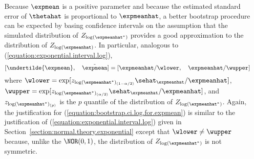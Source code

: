Because $\expmean$ is a positive parameter and because the estimated
standard error of $\thetahat$ is proportional to $\expmeanhat$, a
better bootstrap procedure can be expected by basing confidence
intervals on the assumption that the simulated distribution of
$Z_{\log(\expmeanhat^{*})}$ provides a good approximation to the
distribution of $Z_{\log(\expmeanhat)}$. In particular, analogous to
(\ref{equation:exponential.interval.log}),
\begin{equation}
\label{equation:bootstrap.ci.log.for.expmean}
[ \undertilde{\expmean}, \quad \tilde{\expmean}]=
[\expmeanhat/\wlower, \quad \expmeanhat/\wupper]
\end{equation}
where $\wlower=\exp[ z_{\log(\expmeanhat^{*})_{(1-\alpha/2)}} 
\sehat_{\expmeanhat}/\expmeanhat]$, $\wupper=
\exp[z_{\log(\expmeanhat^{*})_{(\alpha/2)}} \sehat_{\expmeanhat}/
\expmeanhat]$, and
$z_{\log(\expmeanhat^{*})_{(p)}}$ is the $p$ quantile of the
distribution of $Z_{\log(\expmeanhat^{*})}$.  Again, the
justification for (\ref{equation:bootstrap.ci.log.for.expmean}) is
similar to the justification of
(\ref{equation:exponential.interval.log}) given in
Section~\ref{section:normal.theory.exponential} except that $\wlower
\ne \wupper$ because, unlike the $\NOR(0,1)$, the distribution of
$Z_{\log(\expmeanhat^{*})}$ is not symmetric.

